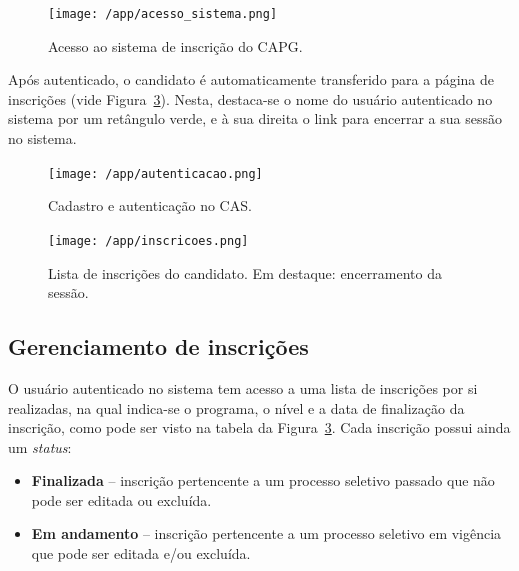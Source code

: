\documentclass[
  10.5pt,				  %
	openright,			%
	twoside,			  %
  a5paper,
  chapter=TITLE,	%
	section=TITLE,	%
  hyphens,        %
	english,        %
	brazil          %
]{abntex2}
\begin{document}
\begin{figure}[!ht]
  \caption{\label{fig:acesso_sistema} Acesso ao sistema de inscrição do CAPG. }
  \begin{center}
    \texttt{[image: /app/acesso\_sistema.png]}
  \end{center}
\end{figure}

Após autenticado, o candidato é automaticamente transferido para a página de inscrições (vide Figura~\ref{fig:inscricoes}). Nesta, destaca-se o nome do usuário autenticado no sistema por um retângulo verde, e à sua direita o link para encerrar a sua sessão no sistema.

\begin{figure}[!ht]
  \caption{\label{fig:autenticacao} Cadastro e autenticação no CAS. }
  \begin{center}
    \texttt{[image: /app/autenticacao.png]}
  \end{center}
\end{figure}


\begin{figure}[!ht]
  \caption{\label{fig:inscricoes} Lista de inscrições do candidato. Em destaque: encerramento da sessão.}
  \begin{center}
    \texttt{[image: /app/inscricoes.png]}
  \end{center}
\end{figure}

\subsection{Gerenciamento de inscrições}\label{sec:gerenciamento_inscricoes}

O usuário autenticado no sistema tem acesso a uma lista de inscrições por si realizadas, na qual indica-se o programa, o nível e a data de finalização da inscrição, como pode ser visto na tabela da Figura~\ref{fig:inscricoes}. Cada inscrição possui ainda um \emph{status}: 

\begin{itemize}
  \item \textbf{Finalizada} -- inscrição pertencente a um processo seletivo passado que não pode ser editada ou excluída.
  \item \textbf{Em andamento} -- inscrição pertencente a um processo seletivo em vigência que pode ser editada e/ou excluída.
\end{itemize}
\end{document}
